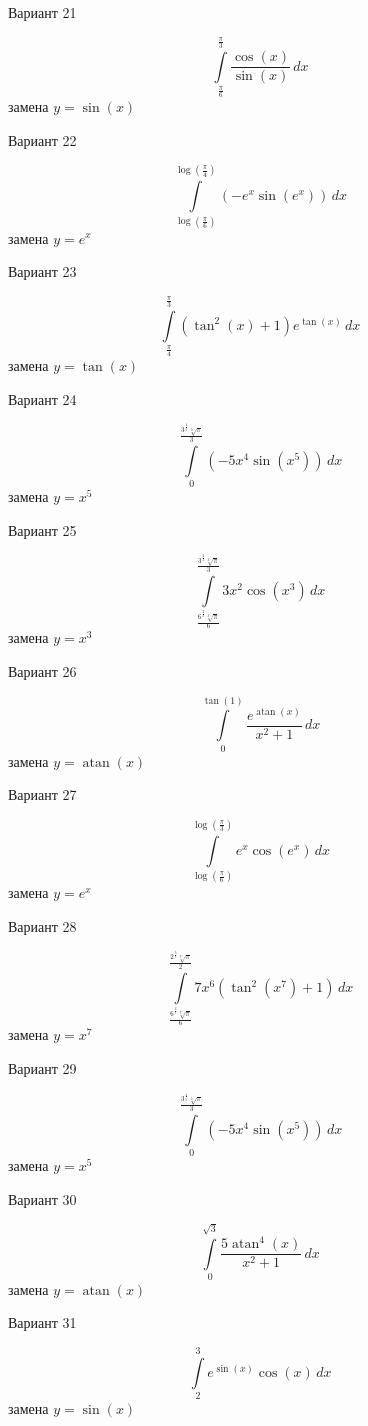 \documentclass[11pt]{report}
\begin{document}
Вариант 21

$$\int\limits_{\frac{\pi}{6}}^{\frac{\pi}{3}} \frac{\cos{\left(x \right)}}{\sin{\left(x \right)}}\, dx$$
замена $y = \sin{\left(x \right)}$

Вариант 22

$$\int\limits_{\log{\left(\frac{\pi}{6} \right)}}^{\log{\left(\frac{\pi}{4} \right)}} \left(- e^{x} \sin{\left(e^{x} \right)}\right)\, dx$$
замена $y = e^{x}$

Вариант 23

$$\int\limits_{\frac{\pi}{4}}^{\frac{\pi}{3}} \left(\tan^{2}{\left(x \right)} + 1\right) e^{\tan{\left(x \right)}}\, dx$$
замена $y = \tan{\left(x \right)}$

Вариант 24

$$\int\limits_{0}^{\frac{3^{\frac{4}{5}} \sqrt[5]{\pi}}{3}} \left(- 5 x^{4} \sin{\left(x^{5} \right)}\right)\, dx$$
замена $y = x^{5}$

Вариант 25

$$\int\limits_{\frac{6^{\frac{2}{3}} \sqrt[3]{\pi}}{6}}^{\frac{3^{\frac{2}{3}} \sqrt[3]{\pi}}{3}} 3 x^{2} \cos{\left(x^{3} \right)}\, dx$$
замена $y = x^{3}$

Вариант 26

$$\int\limits_{0}^{\tan{\left(1 \right)}} \frac{e^{\operatorname{atan}{\left(x \right)}}}{x^{2} + 1}\, dx$$
замена $y = \operatorname{atan}{\left(x \right)}$

Вариант 27

$$\int\limits_{\log{\left(\frac{\pi}{6} \right)}}^{\log{\left(\frac{\pi}{3} \right)}} e^{x} \cos{\left(e^{x} \right)}\, dx$$
замена $y = e^{x}$

Вариант 28

$$\int\limits_{\frac{6^{\frac{6}{7}} \sqrt[7]{\pi}}{6}}^{\frac{2^{\frac{5}{7}} \sqrt[7]{\pi}}{2}} 7 x^{6} \left(\tan^{2}{\left(x^{7} \right)} + 1\right)\, dx$$
замена $y = x^{7}$

Вариант 29

$$\int\limits_{0}^{\frac{3^{\frac{4}{5}} \sqrt[5]{\pi}}{3}} \left(- 5 x^{4} \sin{\left(x^{5} \right)}\right)\, dx$$
замена $y = x^{5}$

Вариант 30

$$\int\limits_{0}^{\sqrt{3}} \frac{5 \operatorname{atan}^{4}{\left(x \right)}}{x^{2} + 1}\, dx$$
замена $y = \operatorname{atan}{\left(x \right)}$

Вариант 31

$$\int\limits_{2}^{3} e^{\sin{\left(x \right)}} \cos{\left(x \right)}\, dx$$
замена $y = \sin{\left(x \right)}$
\end{document}
